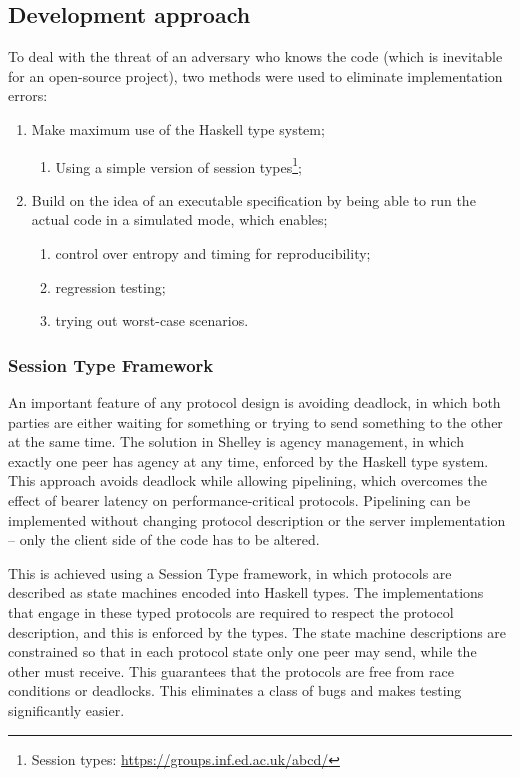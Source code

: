 \documentclass[11pt,a4paper]{article}
\begin{document}
\subsection{Development approach}
\label{development-approach}

To deal with the threat of an adversary who knows the code (which is
inevitable for an open-source project), two methods were used to
eliminate implementation errors:

\begin{enumerate}
\item
  Make maximum use of the Haskell type system;

  \begin{enumerate}
  \item
    Using a simple version of session types\footnote{Session types:
      \href{https://groups.inf.ed.ac.uk/abcd/}{{https://groups.inf.ed.ac.uk/abcd/}}};
  \end{enumerate}
\item
  Build on the idea of an executable specification by being able to run
  the actual code in a simulated mode, which enables;

  \begin{enumerate}
  \item
    control over entropy and timing for reproducibility;
  \item
    regression testing;
  \item
    trying out worst-case scenarios.
  \end{enumerate}
\end{enumerate}

\subsubsection{Session Type Framework}
\label{session-type-framework}

An important feature of any protocol design is avoiding deadlock, in
which both parties are either waiting for something or trying to send
something to the other at the same time. The solution in Shelley is
agency management, in which exactly one peer has agency at any time,
enforced by the Haskell type system. This approach avoids deadlock while
allowing pipelining, which overcomes the effect of bearer latency on
performance-critical protocols. Pipelining can be implemented without
changing protocol description or the server implementation -- only the
client side of the code has to be altered.

This is achieved using a Session Type framework, in which protocols are
described as state machines encoded into Haskell types. The
implementations that engage in these typed protocols are required to
respect the protocol description, and this is enforced by the types. The
state machine descriptions are constrained so that in each protocol
state only one peer may send, while the other must receive. This
guarantees that the protocols are free from race conditions or
deadlocks. This eliminates a class of bugs and makes testing
significantly easier.
\end{document}
